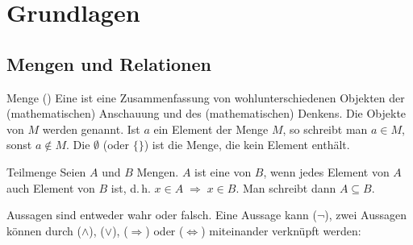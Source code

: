 \section{%
    Grundlagen%
}

\subsection{%
    Mengen und Relationen%
}

\begin{Def}{Menge ()}
    Eine  ist eine Zusammenfassung von wohlunterschiedenen
    Objekten der (mathematischen) Anschauung und des (mathematischen) Denkens.
    Die Objekte von $M$ werden  genannt.
    Ist $a$ ein Element der Menge $M$, so schreibt man $a \in M$, sonst
    $a \notin M$.
    Die  $\emptyset$ (oder $\{\}$) ist die Menge, die
    kein Element enthält.
\end{Def}

\begin{Def}{Teilmenge}
    Seien $A$ und $B$ Mengen.
    $A$ ist eine  von $B$, wenn jedes Element von $A$ auch
    Element von $B$ ist, d.\,h. $x \in A \;\Rightarrow\; x \in B$.
    Man schreibt dann $A \subseteq B$.
\end{Def}

\begin{Def}{Aussagen}
     sind entweder wahr oder falsch.
    Eine Aussage kann  ($\lnot$), zwei Aussagen können durch
     ($\land$),  ($\lor$),
     ($\Rightarrow$) oder
     ($\Leftrightarrow$)
    miteinander verknüpft werden: \\
\end{Def}

